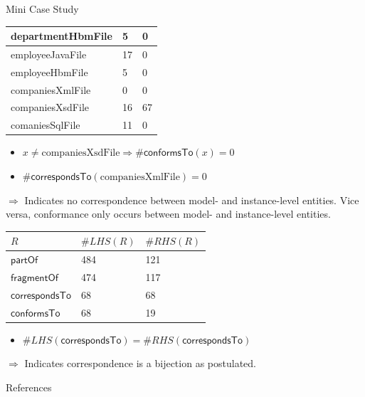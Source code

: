 \documentclass{beamer}
\newcommand{\partOf}{\textsf{partOf}}
\newcommand{\fragmentOf}{\textsf{fragmentOf}}
\newcommand{\correspondsTo}{\textsf{correspondsTo}}
\newcommand{\conformsTo}{\textsf{conformsTo}}
\begin{document}
\begin{frame}{Mini Case Study}
\begin{center}
\begin{tabular}{|l|l|l|}
departmentHbmFile & 5 & 0 
\\ \hline
employeeJavaFile & 17 & 0 
\\ \hline
employeeHbmFile & 5 & 0 
\\ \hline
companiesXmlFile & 0 & 0 
\\ \hline
companiesXsdFile & 16 & 67 
\\ \hline
comaniesSqlFile & 11 & 0 
\\ \hline 
\end{tabular}
\end{center}
\begin{itemize}
\item
$x \neq \text{companiesXsdFile} \Rightarrow \#\conformsTo(x) = 0$
\item
$\#\correspondsTo(\text{companiesXmlFile}) = 0$ 
\end{itemize}
$\Rightarrow$
Indicates no correspondence between model- and instance-level entities.
Vice versa, conformance only occurs between model- and instance-level entities.
\pagebreak
\begin{center}
\begin{tabular}{|l|l|l|}
\hline
$R$ & $\#LHS(R)$ & $\#RHS(R)$
\\ \hline
$\partOf$ & 484 & 121
\\ \hline
$\fragmentOf$ & 474 & 117
\\ \hline
$\correspondsTo$ & 68 & 68
\\ \hline
$\conformsTo$ & 68 & 19
\\ \hline 
\end{tabular}
\end{center}
\begin{itemize}
\item
$\#LHS(\correspondsTo) = \#RHS(\correspondsTo)$
\end{itemize}
$\Rightarrow$
Indicates correspondence is a bijection as postulated.
\end{frame}

\begin{frame}{References}

{}
\end{frame}
\end{document}
